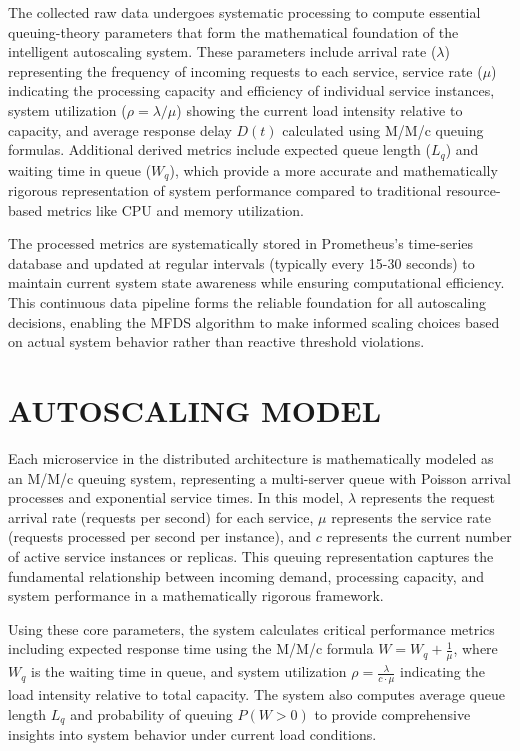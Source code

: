 The collected raw data undergoes systematic processing to compute essential queuing-theory parameters that form the mathematical foundation of the intelligent autoscaling system. These parameters include arrival rate ($\lambda$) representing the frequency of incoming requests to each service, service rate ($\mu$) indicating the processing capacity and efficiency of individual service instances, system utilization ($\rho = \lambda/\mu$) showing the current load intensity relative to capacity, and average response delay $D(t)$ calculated using M/M/c queuing formulas. Additional derived metrics include expected queue length ($L_q$) and waiting time in queue ($W_q$), which provide a more accurate and mathematically rigorous representation of system performance compared to traditional resource-based metrics like CPU and memory utilization.

The processed metrics are systematically stored in Prometheus's time-series database and updated at regular intervals (typically every 15-30 seconds) to maintain current system state awareness while ensuring computational efficiency. This continuous data pipeline forms the reliable foundation for all autoscaling decisions, enabling the MFDS algorithm to make informed scaling choices based on actual system behavior rather than reactive threshold violations.

\section{AUTOSCALING MODEL}

Each microservice in the distributed architecture is mathematically modeled as an M/M/c queuing system, representing a multi-server queue with Poisson arrival processes and exponential service times. In this model, $\lambda$ represents the request arrival rate (requests per second) for each service, $\mu$ represents the service rate (requests processed per second per instance), and $c$ represents the current number of active service instances or replicas. This queuing representation captures the fundamental relationship between incoming demand, processing capacity, and system performance in a mathematically rigorous framework.

Using these core parameters, the system calculates critical performance metrics including expected response time using the M/M/c formula $W = W_q + \frac{1}{\mu}$, where $W_q$ is the waiting time in queue, and system utilization $\rho = \frac{\lambda}{c \cdot \mu}$ indicating the load intensity relative to total capacity. The system also computes average queue length $L_q$ and probability of queuing $P(W > 0)$ to provide comprehensive insights into system behavior under current load conditions.

